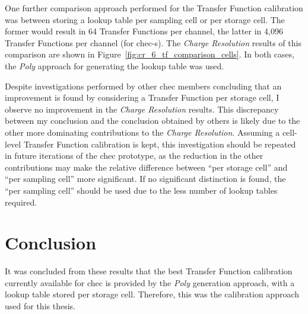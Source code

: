One further comparison approach performed for the Transfer Function calibration was between storing a lookup table per sampling cell or per storage cell. The former would result in 64 Transfer Functions per channel, the latter in 4,096 Transfer Functions per channel (for \gls{chec-s}). The \textit{Charge Resolution} results of this comparison are shown in Figure~\ref{fig:cr_6_tf_comparison_cells}. In both cases, the \textit{Poly} approach for generating the lookup table was used.

Despite investigations performed by other \gls{chec} members concluding that an improvement is found by considering a Transfer Function per storage cell, I observe no improvement in the \textit{Charge Resolution} results. This discrepancy between my conclusion and the conclusion obtained by others is likely due to the other more dominating contributions to the \textit{Charge Resolution}. Assuming a cell-level Transfer Function calibration is kept, this investigation should be repeated in future iterations of the \gls{chec} prototype, as the reduction in the other contributions may make the relative difference between ``per storage cell'' and ``per sampling cell'' more significant. If no significant distinction is found, the ``per sampling cell'' should be used due to the less number of lookup tables required.

\section{Conclusion}

It was concluded from these results that the best Transfer Function calibration currently available for \gls{chec} is provided by the \textit{Poly} generation approach, with a lookup table stored per storage cell. Therefore, this was the calibration approach used for this thesis.